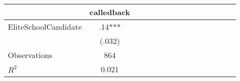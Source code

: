 \begin{tabular}{l*{14}{c}}
                    &\multicolumn{1}{c}{calledback}\\
\hline
EliteSchoolCandidate&         .14***\\
                    &      (.032)   \\
\hline
Observations        &         864   \\
\(R^{2}\)           &       0.021   \\
\end{tabular}
